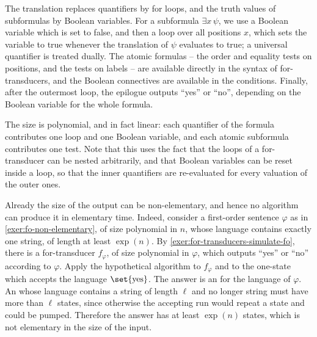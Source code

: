 \exerciseheader

{The translation replaces quantifiers by for loops, and the truth values of subformulas by Boolean variables. For a subformula $\exists x\, \psi$, we use a Boolean variable which is set to false, and then a loop over all positions $x$, which sets the variable to true whenever the translation of $\psi$ evaluates to true; a universal quantifier is treated dually. The atomic formulas -- the order and equality tests on positions, and the tests on labels -- are available directly in the syntax of for-transducers, and the Boolean connectives are available in the conditions. Finally, after the outermost loop, the epilogue outputs ``yes'' or ``no'', depending on the Boolean variable for the whole formula.

The size is polynomial, and in fact linear: each quantifier of the formula contributes one loop and one Boolean variable, and each atomic subformula contributes one test. Note that this uses the fact that the loops of a for-transducer can be nested arbitrarily, and that Boolean variables can be reset inside a loop, so that the inner quantifiers are re-evaluated for every valuation of the outer ones.
}

 {
Already the size of the output \nfa can be non-elementary, and hence no algorithm can produce it in elementary time. Indeed, consider a first-order sentence $\varphi$ as in \cref{exer:fo-non-elementary}, of size polynomial in $n$, whose language contains exactly one string, of length at least $\exp(n)$. By \cref{exer:for-transducers-simulate-fo}, there is a for-transducer $f_\varphi$, of size polynomial in $\varphi$, which outputs ``yes'' or ``no'' according to $\varphi$. Apply the hypothetical algorithm to $f_\varphi$ and to the one-state \nfa which accepts the language $\set{\text{yes}}$. The answer is an \nfa for the language of $\varphi$. An \nfa whose language contains a string of length $\ell$ and no longer string must have more than $\ell$ states, since otherwise the accepting run would repeat a state and could be pumped. Therefore the answer has at least $\exp(n)$ states, which is not elementary in the size of the input.
}

